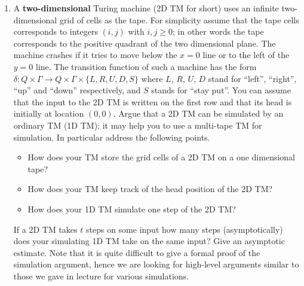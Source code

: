 \documentclass[11pt]{article}
\begin{document}
\begin{enumerate}


\item A {\bf two-dimensional} Turing machine (2D TM for short) uses an infinite
  two-dimensional grid of cells as the tape. For simplicity assume
  that the tape cells corresponds to integers $(i,j)$ with $i,j \ge 0$;
  in other words the tape corresponds to the positive quadrant of the
  two dimensional plane. The machine crashes if it tries to move below
  the $x=0$ line or to the left of the $y=0$ line.  The transition
  function of such a machine has the form
  $\delta: Q \times \Gamma \rightarrow Q \times \Gamma \times
  \{L,R,U,D,S\}$ where $L$, $R$, $U$, $D$ stand for ``left'',
  ``right'', ``up'' and ``down'' respectively, and $S$ stands for
  ``stay put''. You can assume that the input to the 2D TM is written
  on the first row and that its head is initially at location $(0,0)$.
  Argue that a 2D TM can be simulated by an
  ordinary TM (1D TM); it may help you to use a multi-tape TM for
  simulation. In particular address the following points.
  \begin{itemize}
  \item How does your TM store the grid cells of a 2D TM on a one dimensional
    tape?
  \item How does your TM keep track of the head position of the
    2D TM?
  \item How does your 1D TM simulate one step of the
    2D TM?
  \end{itemize}
  If a 2D TM takes $t$ steps on some input how many steps
  (asymptotically) does your simulating 1D TM take on the same input?
  Give an asymptotic estimate. Note that it is quite difficult to give
  a formal proof of the simulation argument, hence we are looking for
  high-level arguments similar to those we gave in lecture for various
  simulations.



\end{enumerate}
\end{document}
